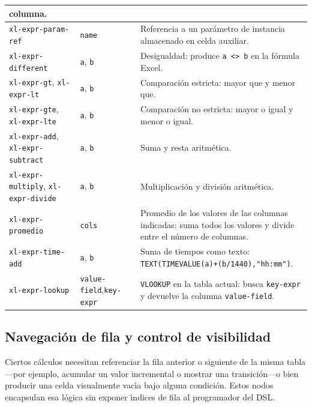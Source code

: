 \documentclass[12pt,a4paper]{report}
\begin{document}
\begin{table}[h!]
\begin{tabular}{p{4.2cm} p{3.8cm} p{5.8cm}}
    columna. \\
\hline
\texttt{xl-expr-param-ref}
  & \texttt{name}
  & Referencia a un par\'ametro de instancia almacenado en celda auxiliar. \\
\hline
\texttt{xl-expr-different}
  & \texttt{a}, \texttt{b}
  & Desigualdad: produce \texttt{a <> b} en la f\'ormula Excel. \\
\hline
\texttt{xl-expr-gt}, \texttt{xl-expr-lt}
  & \texttt{a}, \texttt{b}
  & Comparaci\'on estricta: mayor que y menor que. \\
\hline
\texttt{xl-expr-gte}, \texttt{xl-expr-lte}
  & \texttt{a}, \texttt{b}
  & Comparaci\'on no estricta: mayor o igual y menor o igual. \\
\hline
\texttt{xl-expr-add}, \texttt{xl-expr-subtract}
  & \texttt{a}, \texttt{b}
  & Suma y resta aritm\'etica. \\
\hline
\texttt{xl-expr-multiply}, \texttt{xl-expr-divide}
   & \texttt{a}, \texttt{b}
   & Multiplicaci\'on y divisi\'on aritm\'etica. \\
\hline
\texttt{xl-expr-promedio}
   & \texttt{cols}
   & Promedio de los valores de las columnas indicadas:
     suma todos los valores y divide entre el n\'umero de columnas. \\
\hline
\texttt{xl-expr-time-add}
  & \texttt{a}, \texttt{b}
  & Suma de tiempos como texto:
    \texttt{TEXT(TIMEVALUE(a)+(b/1440),"hh:mm")}. \\
\hline
\texttt{xl-expr-lookup}
  & \texttt{value-field},\newline\texttt{key-expr}
  & \texttt{VLOOKUP} en la tabla actual: busca \texttt{key-expr} y devuelve
    la columna \texttt{value-field}. \\
\hline
\end{tabular}
\end{table}

\subsection{Navegaci\'on de fila y control de visibilidad}
\label{sec:ast-navegacion-fila}

Ciertos c\'alculos necesitan referenciar la fila anterior o siguiente de la
misma tabla---por ejemplo, acumular un valor incremental o mostrar una
transici\'on---o bien producir una celda visualmente vac\'{\i}a bajo alguna
condici\'on.  Estos nodos encapsulan esa l\'ogica sin exponer \'{\i}ndices de
fila al programador del DSL.
\end{document}
